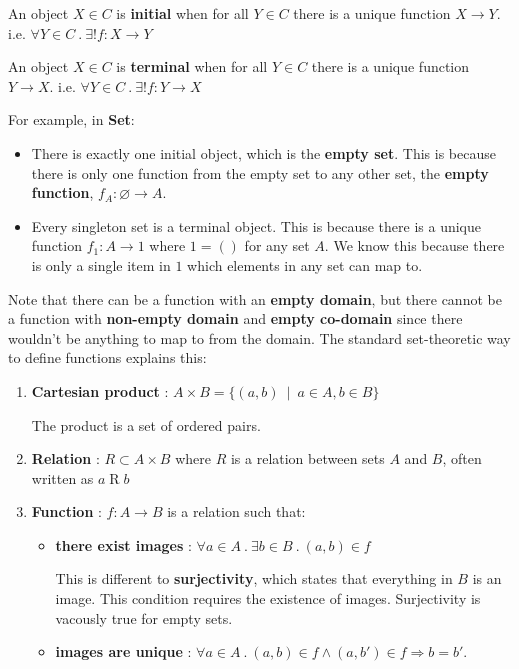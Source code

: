 \documentclass[../main.tex]{subfiles}
\begin{document}
An object $X \in C$ is \textbf{initial} when for all $Y \in C$ there is a unique function $X \rightarrow Y$. i.e. $\forall Y \in C ~.~ \exists ! f : X \rightarrow Y$ \par

An object $X \in C$ is \textbf{terminal} when for all $Y \in C$ there is a unique function $Y \rightarrow X$. i.e. $\forall Y \in C ~.~ \exists ! f : Y \rightarrow X$ \par

For example, in \textbf{Set}:
\begin{itemize}
  \item There is exactly one initial object, which is the \textbf{empty set}. This is because there is only one function from the empty set to any other set, the \textbf{empty function}, $f_A : \varnothing \rightarrow A$.
  \item Every singleton set is a terminal object. This is because there is a unique function $f_1 : A \rightarrow 1$ where $1 = {()}$ for any set $A$. We know this because there is only a single item in $1$ which elements in any set can map to.
\end{itemize}

Note that there can be a function with an \textbf{empty domain}, but there cannot be a function with \textbf{non-empty domain} and \textbf{empty co-domain} since there wouldn't be anything to map to from the domain. The standard set-theoretic way to define functions explains this:
\begin{enumerate}
  \item \textbf{Cartesian product} : $A \times B = \{(a,b) ~\mid~ a \in A, b \in B\}$ \par
        The product is a set of ordered pairs.
  \item \textbf{Relation} : $R \subset A \times B$ where $R$ is a relation between sets $A$ and $B$, often written as $a \mathop R b$
  \item \textbf{Function} : $f : A \rightarrow B$ is a relation such that:
    \begin{itemize}
      \item \textbf{there exist images} : $\forall a \in A ~.~ \exists b \in B ~.~ (a,b) \in f$ \par
            This is different to \textbf{surjectivity}, which states that everything in $B$ is an image. This condition requires the existence of images. Surjectivity is vacously true for empty sets.
      \item \textbf{images are unique} : $\forall a \in A ~.~ (a,b) \in f \wedge (a,b') \in f \Rightarrow b = b'$.
    \end{itemize}
\end{enumerate}
\end{document}
